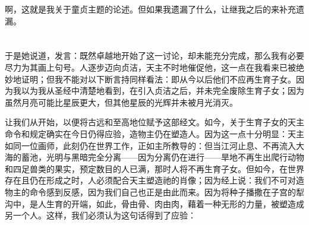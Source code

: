 啊，这就是我关于童贞主题的论述。但如果我遗漏了什么，让继我之后的来补充遗漏。\par



\section{}

\par


\subsection{}

于是她说道，发言：既然卓越地开始了这一讨论，却未能充分完成，那么我有必要尽力为其画上句号。人逐步迈向贞洁，天主不时地催促他，这一点在我看来已被绝妙地证明；但我不能对以下断言持同样看法：即从今以后他们不应再生育子女。因为我以为我从圣经中清楚地看到，在引入贞洁之后，并未完全废除生育子女；因为虽然月亮可能比星辰更大，但其他星辰的光辉并未被月光消灭。\par

让我们从开始，以便将古远和至高地位赋予这部经文。如今，关于生育子女的天主命令和规定确实在今日仍得应验，造物主仍在塑造人。因为这一点十分明显：天主如同一位画师，此刻仍在世界工作，正如主所教导的：但当江河止息、不再流入大海的蓄池，光明与黑暗完全分离——因为分离仍在进行——旱地不再生出爬行动物和四足兽类的果实，预定数目的人已满，那时人将不再生育子女。但如今，在世界存在且仍在形成之时，人必须配合天主塑造祂的肖像；因为经上说：我们不可对造物主的命令感到反感，因为我们自己也正是由此而来。因为将种子播撒在子宫的犁沟中，是人生育的开端，如此，骨由骨、肉由肉，藉着一种无形的力量，被塑造成另一个人。这样，我们必须认为这句话得到了应验：\par


